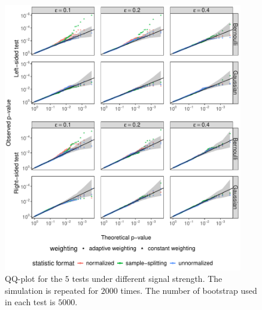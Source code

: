 \documentclass[12pt]{article}
\begin{document}
\begin{figure}[!ht]
	\centering
	\includegraphics[width=0.93\textwidth]{figures-and-tables/simulation/eps_greedy_qq_plot.pdf}

	\caption{QQ-plot for the $5$ tests under different signal strength. The simulation is repeated for $2000$ times. The number of bootstrap used in each test is $5000$.}
	\label{fig:simulation-qq-plot-eps-greedy}
\end{figure}
\end{document}
